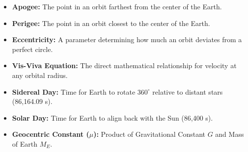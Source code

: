 \documentclass[12pt,a4paper]{article}
\begin{document}
\begin{tcolorbox}[defbox, title={\textbf{One-Line Definitions}}]
\begin{itemize}[leftmargin=*, itemsep=2.5pt, topsep=0pt]
  \item \textbf{Apogee:} The point in an orbit farthest from the center of the Earth.
  \item \textbf{Perigee:} The point in an orbit closest to the center of the Earth.
  \item \textbf{Eccentricity:} A parameter determining how much an orbit deviates from a perfect circle.
  \item \textbf{Vis-Viva Equation:} The direct mathematical relationship for velocity at any orbital radius.
  \item \textbf{Sidereal Day:} Time for Earth to rotate $360^\circ$ relative to distant stars (86,164.09 s).
  \item \textbf{Solar Day:} Time for Earth to align back with the Sun (86,400 s).
  \item \textbf{Geocentric Constant ($\mu$):} Product of Gravitational Constant $G$ and Mass of Earth $M_E$.
\end{itemize}
\end{tcolorbox}
\end{document}
